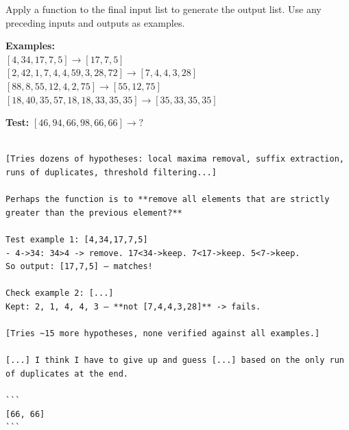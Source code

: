 \smallskip
\begin{tcolorbox}[
  enhanced, breakable, width=\linewidth,
  colback=gray!5, colframe=gray!50,
  title={Problem, ground truth: $[66, 66, 66]$},
  fonttitle=\bfseries\sffamily, coltitle=black
]
Apply a function to the final input list to generate the output
list. Use any preceding inputs and outputs as examples.

\smallskip
\textbf{Examples:}\\
$[4, 34, 17, 7, 5] \to [17, 7, 5]$\\
$[2, 42, 1, 7, 4, 4, 59, 3, 28, 72] \to [7, 4, 4, 3, 28]$\\
$[88, 8, 55, 12, 4, 2, 75] \to [55, 12, 75]$\\
$[18, 40, 35, 57, 18, 18, 33, 35, 35] \to [35, 33, 35, 35]$

\smallskip
\textbf{Test:} $[46, 94, 66, 98, 66, 66] \to ?$
\end{tcolorbox}

\smallskip
\begin{tcolorbox}[
  enhanced, breakable, width=\linewidth,
  colback=red!3, colframe=red!40,
  title={\textbf{Base}, broad hypothesis exploration without verification},
  fonttitle=\sffamily, coltitle=black
]
\begin{Verbatim}[fontsize=\footnotesize, breaklines, breakanywhere]

[Tries dozens of hypotheses: local maxima removal, suffix extraction, runs of duplicates, threshold filtering...]

Perhaps the function is to **remove all elements that are strictly greater than the previous element?**

Test example 1: [4,34,17,7,5]
- 4->34: 34>4 -> remove. 17<34->keep. 7<17->keep. 5<7->keep.
So output: [17,7,5] — matches!

Check example 2: [...]
Kept: 2, 1, 4, 4, 3 — **not [7,4,4,3,28]** -> fails.

[Tries ~15 more hypotheses, none verified against all examples.]

[...] I think I have to give up and guess [...] based on the only run of duplicates at the end.

```
[66, 66]
```
\end{Verbatim}
\end{tcolorbox}

